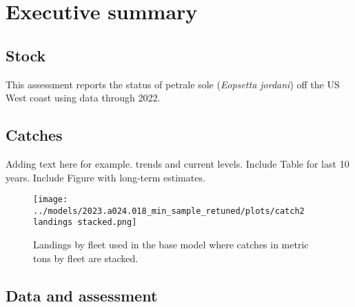 \documentclass[11pt,
  english,
  letterpaper,
]{article}
\begin{document}
\newcommand{\lt}{\ensuremath <}
\newcommand{\gt}{\ensuremath >}

\pagebreak
{}
\setcounter{page}{1}

\renewcommand{\thetable}{\roman{table}}
\renewcommand{\thefigure}{\roman{figure}}

\setlength\parskip{0.5em plus 0.1em minus 0.2em}

\hypertarget{executive-summary}{%
\section*{Executive summary}\label{executive-summary}}

\hypertarget{stock}{%
\subsection*{Stock}\label{stock}}

This assessment reports the status of petrale sole (\emph{Eopsetta jordani}) off the US West coast using data through 2022.

\hypertarget{catches}{%
\subsection*{Catches}\label{catches}}

Adding text here for example. trends and current levels. Include Table for last 10 years. Include Figure with long-term estimates.

\clearpage



\begin{figure}
\centering
\texttt{[image: ../models/2023.a024.018\_min\_sample\_retuned/plots/catch2 landings stacked.png]}
\caption{Landings by fleet used in the base model where catches in metric tons by fleet are stacked.\label{fig:es-catch}}
\end{figure}

\clearpage

\hypertarget{data-and-assessment}{%
\subsection*{Data and assessment}\label{data-and-assessment}}
\end{document}
